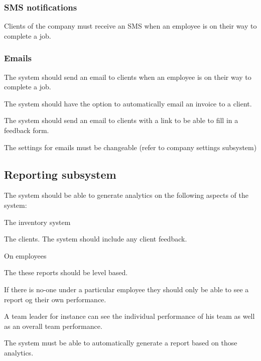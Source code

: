 \documentclass{article}
\begin{document}
		\subsubsection*{SMS notifications}	
		\begin{list}{R.}{}
			\item Clients of the company must receive an SMS when an employee is on their way to complete a job.
		\end{list}
		
		\subsubsection*{Emails}	
		\begin{list}{R.}{}
			\item The system should send an email to clients when an employee is on their way to complete a job.
			\item The system should have the option to automatically email an invoice to a client.
			\item The system should send an email to clients with a link to be able to fill in a feedback form.
			\item The settings for emails must be changeable (refer to company settings subsystem) 
		\end{list}
	
	
	\subsection*{Reporting subsystem}	
	\begin{list}{R.}{}
		\item The system should be able to generate analytics on the following aspects of the system:
		\begin{list}{R.}{}
			\item The inventory system
			\item The clients. The system should include any client feedback.
			\item On employees
			\begin{list}{R..}{}
				\item The these reports should be level based.
				\item If there is no-one under a particular employee they should only be able to see a report og their own performance.
				\item A team leader for instance can see the individual performance of his team as well as an overall team performance.
			\end{list}
		\end{list}
		\item The system must be able to automatically generate a report based on those analytics. 
	\end{list}
	
\end{document}
